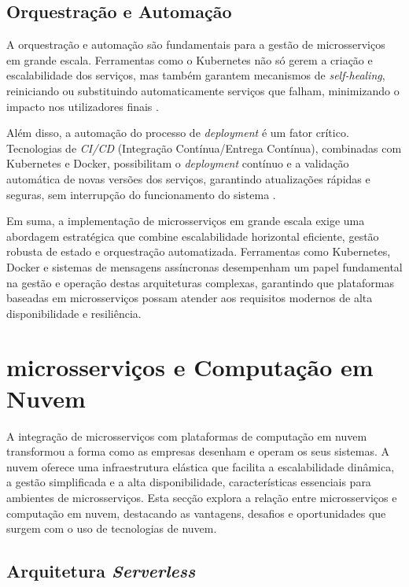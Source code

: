 \subsection{Orquestração e Automação}

A orquestração e automação são fundamentais para a gestão de microsserviços em grande escala. Ferramentas como o Kubernetes não só gerem a criação e escalabilidade dos serviços, mas também garantem mecanismos de \textit{self-healing}, reiniciando ou substituindo automaticamente serviços que falham, minimizando o impacto nos utilizadores finais \cite{Burns2016}. 

Além disso, a automação do processo de \textit{deployment} é um fator crítico. Tecnologias de \textit{CI/CD} (Integração Contínua/Entrega Contínua), combinadas com Kubernetes e Docker, possibilitam o \textit{deployment} contínuo e a validação automática de novas versões dos serviços, garantindo atualizações rápidas e seguras, sem interrupção do funcionamento do sistema \cite{Taherizadeh2020}.

Em suma, a implementação de microsserviços em grande escala exige uma abordagem estratégica que combine escalabilidade horizontal eficiente, gestão robusta de estado e orquestração automatizada. Ferramentas como Kubernetes, Docker e sistemas de mensagens assíncronas desempenham um papel fundamental na gestão e operação destas arquiteturas complexas, garantindo que plataformas baseadas em microsserviços possam atender aos requisitos modernos de alta disponibilidade e resiliência.

\section{microsserviços e Computação em Nuvem}

A integração de microsserviços com plataformas de computação em nuvem transformou a forma como as empresas desenham e operam os seus sistemas. A nuvem oferece uma infraestrutura elástica que facilita a escalabilidade dinâmica, a gestão simplificada e a alta disponibilidade, características essenciais para ambientes de microsserviços. Esta secção explora a relação entre microsserviços e computação em nuvem, destacando as vantagens, desafios e oportunidades que surgem com o uso de tecnologias de nuvem.

\subsection{Arquitetura \textit{Serverless}}

